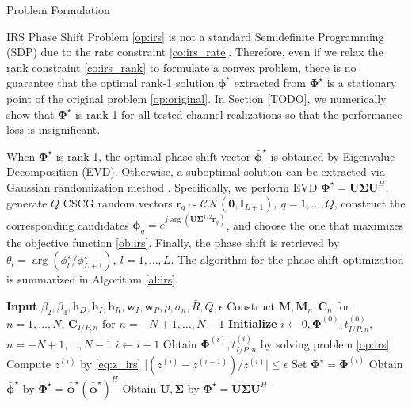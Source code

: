 \documentclass{IEEEtran}
\begin{document}
\begin{section}{Problem Formulation}
\begin{subsection}{IRS Phase Shift}
		Problem \ref{op:irs} is not a standard Semidefinite Programming (SDP) due to the rate constraint \ref{co:irs_rate}. Therefore, even if we relax the rank constraint \ref{co:irs_rank} to formulate a convex problem, there is no guarantee that the optimal rank-1 solution $\bar{\boldsymbol{\phi}}^{\star}$ extracted from $\boldsymbol{\Phi}^{\star}$ is a stationary point of the original problem \ref{op:original}. In Section [TODO], we numerically show that $\boldsymbol{\Phi}^{\star}$ is rank-1 for all tested channel realizations so that the performance loss is insignificant.

		When $\boldsymbol{\Phi}^{\star}$ is rank-1, the optimal phase shift vector $\bar{\boldsymbol{\phi}}^\star$ is obtained by Eigenvalue Decomposition (EVD). Otherwise, a suboptimal solution can be extracted via Gaussian randomization method \cite{Huang2010}. Specifically, we perform EVD $\boldsymbol{\Phi}^{\star}=\boldsymbol{U}\boldsymbol{\Sigma}\boldsymbol{U}^H$, generate $Q$ CSCG random vectors $\boldsymbol{r}_q \sim \mathcal{CN}(\boldsymbol{0},\boldsymbol{I}_{L+1}),\ q=1,\dots,Q$, construct the corresponding candidates $\bar{\boldsymbol{\phi}}_q=e^{j\arg\left(\boldsymbol{U}\boldsymbol{\Sigma}^{1/2}\boldsymbol{r}_q\right)}$, and choose the one that maximizes the objective function \ref{ob:irs}. Finally, the phase shift is retrieved by $\theta_l=\arg(\phi_l^\star/\phi_{L+1}^\star), \ l=1,\dots,L$. The algorithm for the phase shift optimization is summarized in Algorithm \ref{al:irs}.
		\begin{algorithm}
			\caption{SCA: IRS Phase Shift}
			\label{al:irs}
			\begin{algorithmic}[1]
				\State \textbf{Input} $\beta_2,\beta_4,\boldsymbol{h}_D,\boldsymbol{h}_I,\boldsymbol{h}_R,\boldsymbol{w}_I,\boldsymbol{w}_P,\rho,\sigma_n,\bar{R},Q,\epsilon$
				\State Construct $\boldsymbol{M},\boldsymbol{M}_n,\boldsymbol{C}_{n}$ for $n=1,\dots,N$, $\boldsymbol{C}_{I/P,n}$ for $n=-N+1,\dots,N-1$
				\State \textbf{Initialize} $i \gets 0,\boldsymbol{\Phi}^{(0)},t_{I/P,n}^{(0)}$, $n=-N+1,\dots,N-1$
				\Repeat
					\State $i \gets i + 1$
					\State Obtain $\boldsymbol{\Phi}^{(i)}, t_{I/P,n}^{(i)}$ by solving problem \ref{op:irs}
					\State Compute $z^{(i)}$ by \ref{eq:z_irs}
				\Until $\lvert (z^{(i)}-z^{(i-1)}) / z^{(i)} \rvert \le \epsilon$
				\State Set $\boldsymbol{\Phi}^{\star}=\boldsymbol{\Phi}^{(i)}$
					\State Obtain $\bar{\boldsymbol{\phi}}^\star$ by $\boldsymbol{\Phi}^{\star}=\bar{\boldsymbol{\phi}}^\star(\bar{\boldsymbol{\phi}}^\star)^H$
				\Else
					\State Obtain $\boldsymbol{U},\boldsymbol{\Sigma}$ by $\boldsymbol{\Phi}^{\star}=\boldsymbol{U}\boldsymbol{\Sigma}\boldsymbol{U}^H$


\end{algorithmic}
\end{algorithm}
\end{subsection}
\end{section}
\end{document}
